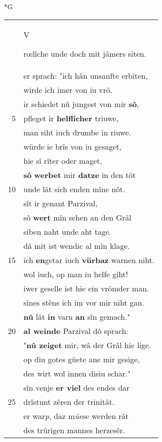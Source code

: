 \documentclass[8pt,a4paper,notitlepage]{article}
\begin{document}
\begin{table}[ht]
\begin{minipage}[t]{0.5\linewidth}
\small
\begin{center}*G
\end{center}
\begin{tabular}{rl}
 & \begin{large}V\end{large}rœlîche unde doch mit jâmers siten.\\ 
 & er sprach: "ich hân unsanfte erbiten,\\ 
 & wirde ich imer von iu vrô.\\ 
 & ir schiedet nû jungest von mir \textbf{sô},\\ 
5 & pfleget ir \textbf{helflîcher} triuwe,\\ 
 & man siht iuch drumbe in riuwe.\\ 
 & würde ie brîs von iu gesaget,\\ 
 & hie sî rîter oder maget,\\ 
 & \textbf{sô} \textbf{werbet} mir \textbf{datze} in den tôt\\ 
10 & unde lât sich enden mîne nôt.\\ 
 & sît ir genant Parzival,\\ 
 & sô \textbf{wert} mîn sehen an den Grâl\\ 
 & siben naht unde aht tage.\\ 
 & dâ mit ist wendic al mîn klage.\\ 
15 & ich \textbf{en}getar iuch \textbf{vürbaz} warnen niht.\\ 
 & wol iuch, op man iu helfe giht!\\ 
 & iwer geselle ist hie ein vrömder man.\\ 
 & sînes stêns ich im vor mir niht gan.\\ 
 & \textbf{nû} lât \textbf{in} varn \textbf{an} sîn gemach."\\ 
20 & \textbf{al weinde} Parzival dô sprach:\\ 
 & "\textbf{nû zeiget} mir, wâ der Grâl hie lige.\\ 
 & op diu gotes güete ane mir gesige,\\ 
 & des wirt wol innen disiu schar."\\ 
 & sîn venje \textbf{er viel} des endes dar\\ 
25 & drîstunt zêren der trinitât.\\ 
 & er war\textit{p}, daz m\textit{üe}se werden rât\\ 
 & des trûrigen mannes herzesêr.\\ 

\end{tabular}
\end{minipage}
\end{table}
\end{document}
